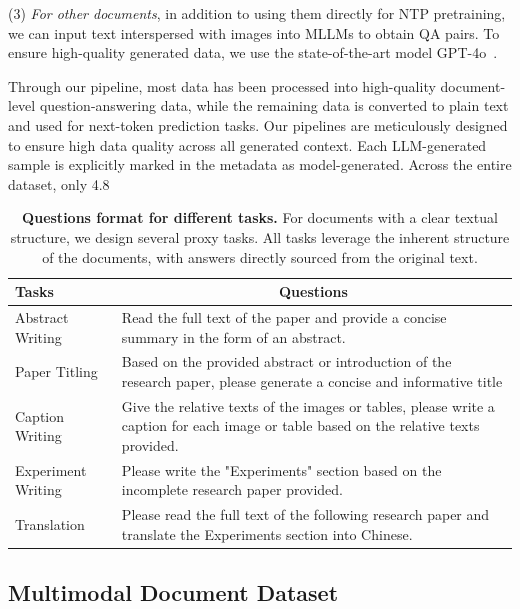 \documentclass[10pt,twocolumn,letterpaper]{article}
\begin{document}
\begin{CJK}{UTF8}{gbsn}
(3) \textit{For other documents}, in addition to using them directly for NTP pretraining, we can input text interspersed with images into MLLMs to obtain QA pairs. To ensure high-quality generated data, we use the state-of-the-art model GPT-4o~\cite{gpt4v}. 


Through our pipeline, most data has been processed into high-quality document-level question-answering data, while the remaining data is converted to plain text and used for next-token prediction tasks. Our pipelines are meticulously designed to ensure high data quality across all generated context. Each LLM-generated sample is explicitly marked in the metadata as model-generated. Across the entire dataset, only 4.8\

\begin{table}[]
\small
\begin{tabular}{lp{4.7cm}}
\toprule
Tasks             & \multicolumn{1}{c}{Questions} \\ 
\midrule
Abstract Writing    &  
Read the full text of the paper and provide a concise summary in the form of an abstract.     
\\
\midrule
Paper Titling      &  Based on the provided abstract or introduction of the research paper, please generate a concise and informative title          \\
\midrule
Caption Writing    &  Give the relative texts of the images or tables, please write a caption for each image or table based on the relative texts provided.   \\
\midrule
Experiment Writing &  Please write the "Experiments" section based on the incomplete research paper provided.       \\
\midrule
Translation        &  Please read the full text of the following research paper and translate the Experiments section into Chinese.         \\
\bottomrule
\end{tabular}
\caption{\textbf{Questions format for different tasks.}
For documents with a clear textual structure, we design several proxy tasks. All tasks leverage the inherent structure of the documents, with answers directly sourced from the original text.
}
\label{tab:task_format}

\vspace{-3mm}

\end{table}

\subsection{Multimodal Document Dataset}


\end{CJK}
\end{document}
